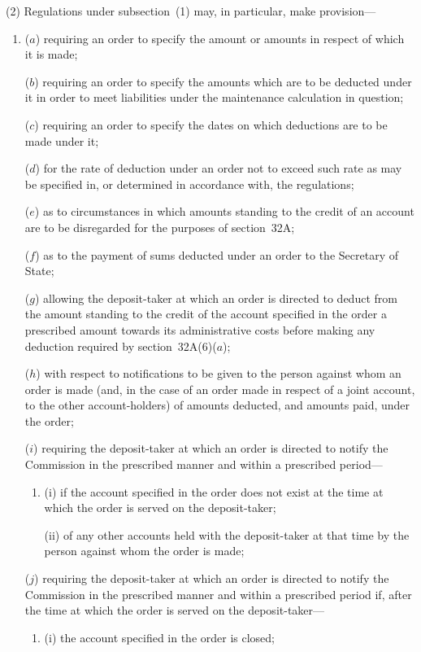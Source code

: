 \documentclass[12pt,a4paper]{article}
\begin{document}
(2) Regulations under subsection~(1) may, in particular, make provision---
\begin{enumerate}\item[]
($a$) requiring an order to specify the amount or amounts in respect of which it is made;

($b$) requiring an order to specify the amounts which are to be deducted under it
in order to meet liabilities under the maintenance calculation in question;

($c$) requiring an order to specify the dates on which deductions are to be made
under it;

($d$) for the rate of deduction under an order not to exceed such rate as may be
specified in, or determined in accordance with, the regulations;

($e$) as to circumstances in which amounts standing to the credit of an account
are to be disregarded for the purposes of section~32A;

($f$) as to the payment of sums deducted under an order to the Secretary of
State;

($g$) allowing the deposit-taker at which an order is directed to deduct from the
amount standing to the credit of the account specified in the order a prescribed
amount towards its administrative costs before making any deduction required
by section~32A(6)($a$);

($h$) with respect to notifications to be given to the person against whom an order
is made (and, in the case of an order made in respect of a joint account, to the
other account-holders) of amounts deducted, and amounts paid, under the
order;

($i$) requiring the deposit-taker at which an order is directed to notify the
Commission in the prescribed manner and within a prescribed period---
\begin{enumerate}\item[]
(i)
if the account specified in the order does not exist at the time at which
the order is served on the deposit-taker;

(ii)
of any other accounts held with the deposit-taker at that time by the
person against whom the order is made;
\end{enumerate}

($j$) requiring the deposit-taker at which an order is directed to notify the
Commission in the prescribed manner and within a prescribed period
if, after the time at which the order is served on the deposit-taker---
\begin{enumerate}\item[]
(i) the account specified in the order is closed;


\end{enumerate}
\end{enumerate}
\end{document}
